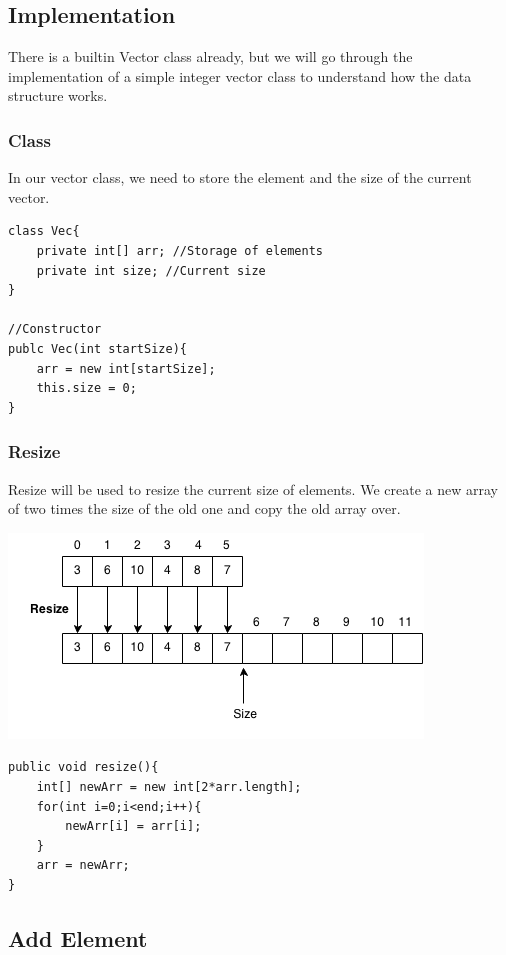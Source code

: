 \documentclass[11pt,oneside]{book}
\makeatletter
\def\maxwidth#1{\ifdim\Gin@nat@width>#1 #1\else\Gin@nat@width\fi}
\makeatother
\begin{document}
\subsection{Implementation}

There is a builtin Vector class already, but we will go through the implementation of a simple integer vector class to understand how the data structure works.

\subsubsection{Class}

In our vector class, we need to store the element and the size of the current vector.

\begin{lstlisting}
class Vec{
    private int[] arr; //Storage of elements
    private int size; //Current size
}

//Constructor
publc Vec(int startSize){
    arr = new int[startSize];
    this.size = 0;
}

\end{lstlisting}

\subsubsection{Resize}

Resize will be used to resize the current size of elements. We create a new array of two times the size of the old one and copy the old array over.

\includegraphics[width=\maxwidth{\textwidth}]{vector3.png}

\begin{lstlisting}
public void resize(){
    int[] newArr = new int[2*arr.length];
    for(int i=0;i<end;i++){
        newArr[i] = arr[i];
    }
    arr = newArr;
}
\end{lstlisting}

\subsection{Add Element}
\end{document}
